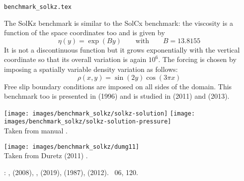 \begin{flushright} {\tiny {\color{gray} \tt benchmark\_solkz.tex}} \end{flushright}

The SolKz benchmark is similar to the SolCx benchmark: 
the viscosity is a function of the space coordinates too and is given by 
\[
\eta(y)=\exp(By) \qquad \text{with} \qquad B=13.8155
\]
It is not a discontinuous function but it grows exponentially with the 
vertical coordinate so that its overall variation is again $10^6$. 
The forcing is chosen by imposing a spatially variable density variation as follows:
\[
\rho(x,y)=\sin(2y) \cos(3\pi x)
\]
Free slip boundary conditions are imposed on all sides of the domain.
This benchmark too is presented in \textcite{zhon96} (1996) 
and is studied in \textcite{dumg11} (2011) and \textcite{gemd13} (2013).

\begin{center}
\texttt{[image: images/benchmark\_solkz/solkz-solution]}
\texttt{[image: images/benchmark\_solkz/solkz-solution-pressure]}\\
{\captionfont Taken from \aspect manual \cite{aspectmanual}.}
\end{center}


\begin{center}
\texttt{[image: images/benchmark\_solkz/dumg11]}\\
{\captionfont Taken from Duretz \etal (2011) \cite{dumg11}.}
\end{center}

\Literature: \textcite{mozg96}, \textcite{mamo08} (2008), 
\cite{vemmXX}, 
\textcite{demh19} (2019), 
\textcite{repa87} (1987),
\textcite{krhb12} (2012).
\stone~06, 120.
